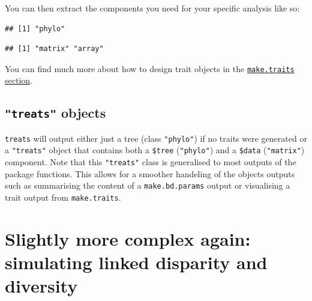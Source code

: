 \documentclass[
]{book}
\newenvironment{Shaded}{\begin{snugshade}}{\end{snugshade}}
\newcommand{\CommentTok}[1]{\textcolor[rgb]{0.56,0.35,0.01}{\textit{#1}}}
\newcommand{\KeywordTok}[1]{\textcolor[rgb]{0.13,0.29,0.53}{\textbf{#1}}}
\newcommand{\NormalTok}[1]{#1}
\newcommand{\OperatorTok}[1]{\textcolor[rgb]{0.81,0.36,0.00}{\textbf{#1}}}
\newcommand{\StringTok}[1]{\textcolor[rgb]{0.31,0.60,0.02}{#1}}
\begin{document}
You can then extract the components you need for your specific analysis like so:

\begin{Shaded}
\end{Shaded}

\begin{verbatim}
## [1] "phylo"
\end{verbatim}

\begin{Shaded}
\end{Shaded}

\begin{verbatim}
## [1] "matrix" "array"
\end{verbatim}

You can find much more about how to design trait objects in the \protect\hyperlink{maketraits}{\texttt{make.traits} section}.

\hypertarget{treats-objects}{%
\subsection{\texorpdfstring{\texttt{"treats"} objects}{"treats" objects}}\label{treats-objects}}

\texttt{treats} will output either just a tree (class \texttt{"phylo"}) if no traits were generated or a \texttt{"treats"} object that contains both a \texttt{\$tree} (\texttt{"phylo"}) and a \texttt{\$data} (\texttt{"matrix"}) component.
Note that this \texttt{"treats"} class is generalised to most outputs of the package functions.
This allows for a smoother handeling of the objects outputs such as summarising the content of a \texttt{make.bd.params} output or visualising a trait output from \texttt{make.traits}.

\hypertarget{slightly-more-complex-again-simulating-linked-disparity-and-diversity}{%
\section{Slightly more complex again: simulating linked disparity and diversity}\label{slightly-more-complex-again-simulating-linked-disparity-and-diversity}}
\end{document}
